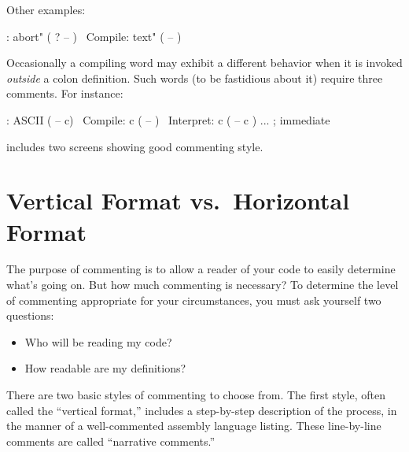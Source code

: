 Other examples:
\begin{Code}
: abort"  ( ? -- )
\ Compile:   text"   ( -- )
\end{Code}
Occasionally a compiling word may exhibit a different behavior when it
is invoked \emph{outside} a colon definition.  Such words (to be
fastidious about it) require three comments.  For instance:
\begin{Code}
: ASCII  ( -- c)
\ Compile:   c   ( -- )
\ Interpret:   c   ( -- c )
     ... ; immediate
\end{Code}
 includes two screens showing good commenting style.%
%
%

\section{Vertical Format vs.\ Horizontal Format}%
%
The purpose of commenting is to allow a reader of your code to easily
determine what's going on.  But how much commenting is necessary? To
determine the level of commenting appropriate for your circumstances,
you must ask yourself two questions:

\begin{itemize}
\expandafter\item\ifeightyfour[]\fi Who will be reading my code?
\expandafter\item\ifeightyfour[]\fi How readable are my definitions?
\end{itemize}%
There are two basic styles of commenting to choose from.  The first
style, often called the ``vertical format,'' includes a step-by-step
description of the process, in the manner of a well-commented assembly
language listing.  These line-by-line comments are called ``narrative
comments.''

